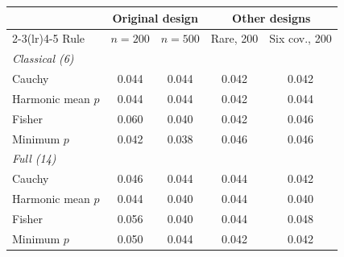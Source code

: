 \begin{tabular}{lcccc}
\toprule
 & \multicolumn{2}{c}{Original design} & \multicolumn{2}{c}{Other designs} \\
\cmidrule(lr){2-3}\cmidrule(lr){4-5}
Rule & $n=200$ & $n=500$ & Rare, 200 & Six cov., 200 \\
\midrule
\multicolumn{5}{l}{\emph{Classical (6)}} \\
Cauchy & 0.044 & 0.044 & 0.042 & 0.042 \\
Harmonic mean $p$ & 0.044 & 0.044 & 0.042 & 0.044 \\
Fisher & 0.060 & 0.040 & 0.042 & 0.046 \\
Minimum $p$ & 0.042 & 0.038 & 0.046 & 0.046 \\
\multicolumn{5}{l}{\emph{Full (14)}} \\
Cauchy & 0.046 & 0.044 & 0.044 & 0.042 \\
Harmonic mean $p$ & 0.044 & 0.040 & 0.044 & 0.040 \\
Fisher & 0.056 & 0.040 & 0.044 & 0.048 \\
Minimum $p$ & 0.050 & 0.044 & 0.042 & 0.042 \\
\bottomrule
\end{tabular}